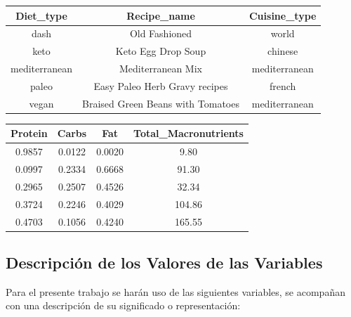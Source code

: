 \documentclass[12pt,a4paper]{article}
\begin{document}
        \begin{center}

            \begin{tabular}{| c | c | c |}
                \toprule
                \textbf{Diet\_type} & \textbf{Recipe\_name} & \textbf{Cuisine\_type} \\
                \midrule
                dash          & Old Fashioned                     & world \\
                keto          & Keto Egg Drop Soup                & chinese \\
                mediterranean & Mediterranean Mix                 & mediterranean \\
                paleo         & Easy Paleo Herb Gravy recipes     & french \\
                vegan         & Braised Green Beans with Tomatoes & mediterranean \\
                \bottomrule
            \end{tabular}

        \end{center}

        \begin{center}

            \begin{tabular}{| c | c | c | c |}
                \toprule
                \textbf{Protein} & \textbf{Carbs} & \textbf{Fat} & \textbf{Total\_Macronutrients} \\
                \midrule
                0.9857 & 0.0122 & 0.0020 &   9.80 \\
                0.0997 & 0.2334 & 0.6668 &  91.30 \\
                0.2965 & 0.2507 & 0.4526 &  32.34 \\
                0.3724 & 0.2246 & 0.4029 & 104.86 \\
                0.4703 & 0.1056 & 0.4240 & 165.55 \\
                \bottomrule
            \end{tabular}

        \end{center}

    \subsection{Descripción de los Valores de las Variables}

        Para el presente trabajo se harán uso de las siguientes variables, se 
        acompañan con una descripción de su significado o representación:
\end{document}
